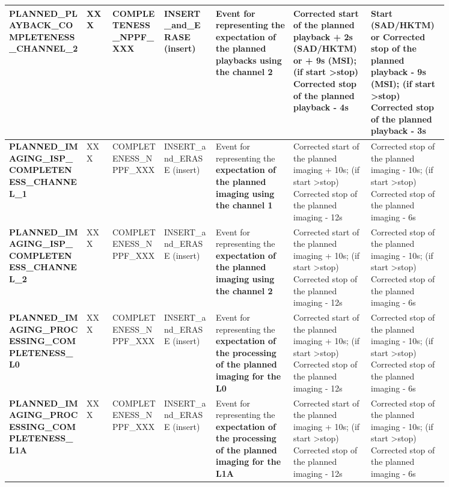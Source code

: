 \begin{landscape}
\begin{longtable}{|M{0.15\linewidth}|M{0.05\linewidth}|M{0.10\linewidth}|M{0.10\linewidth}|M{0.15\linewidth}|M{0.15\linewidth}|M{0.15\linewidth}|}
\textbf{PLANNED\_PLAYBACK\_COMPLETENESS\_CHANNEL\_2} & XXX & \- COMPLETENESS\_NPPF\_XXX & INSERT\_and\_ERASE (insert) & Event for representing the \textbf{expectation of the planned playbacks using the channel 2} & Corrected start of the planned playback + 2s (SAD/HKTM) or + 9s (MSI); (if start \textgreater  stop) Corrected stop of the planned playback - 4s & Start (SAD/HKTM) or Corrected stop of the planned playback - 9s (MSI); (if start \textgreater  stop) Corrected stop of the planned playback - 3s \\ \hline
\textbf{PLANNED\_IMAGING\_ISP\_COMPLETENESS\_CHANNEL\_1} & XXX & \- COMPLETENESS\_NPPF\_XXX & INSERT\_and\_ERASE (insert) & Event for representing the \textbf{expectation of the planned imaging using the channel 1} & Corrected start of the planned imaging + 10s; (if start \textgreater  stop) Corrected stop of the planned imaging - 12s & Corrected stop of the planned imaging - 10s; (if start \textgreater  stop) Corrected stop of the planned imaging - 6s \\ \hline
\textbf{PLANNED\_IMAGING\_ISP\_COMPLETENESS\_CHANNEL\_2} & XXX & \- COMPLETENESS\_NPPF\_XXX & INSERT\_and\_ERASE (insert) & Event for representing the \textbf{expectation of the planned imaging using the channel 2} & Corrected start of the planned imaging + 10s; (if start \textgreater  stop) Corrected stop of the planned imaging - 12s & Corrected stop of the planned imaging - 10s; (if start \textgreater  stop) Corrected stop of the planned imaging - 6s \\ \hline
\textbf{PLANNED\_IMAGING\_PROCESSING\_COMPLETENESS\_L0} & XXX & \- COMPLETENESS\_NPPF\_XXX & INSERT\_and\_ERASE (insert) & Event for representing the \textbf{expectation of the processing of the planned imaging for the L0} & Corrected start of the planned imaging + 10s; (if start \textgreater  stop) Corrected stop of the planned imaging - 12s & Corrected stop of the planned imaging - 10s; (if start \textgreater  stop) Corrected stop of the planned imaging - 6s \\ \hline
\textbf{PLANNED\_IMAGING\_PROCESSING\_COMPLETENESS\_L1A} & XXX & \- COMPLETENESS\_NPPF\_XXX & INSERT\_and\_ERASE (insert) & Event for representing the \textbf{expectation of the processing of the planned imaging for the L1A} & Corrected start of the planned imaging + 10s; (if start \textgreater  stop) Corrected stop of the planned imaging - 12s & Corrected stop of the planned imaging - 10s; (if start \textgreater  stop) Corrected stop of the planned imaging - 6s \\ \hline

\end{longtable}
\end{landscape}
